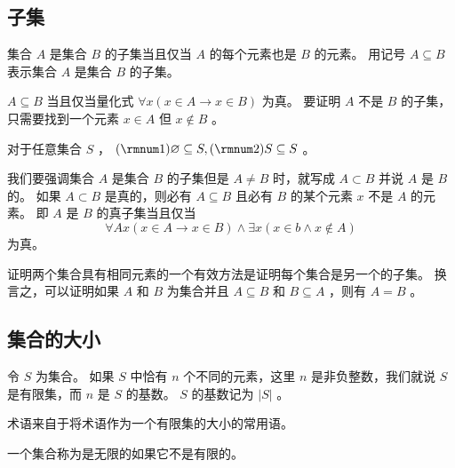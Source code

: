 {    \subsection{子集}
    {
        \begin{defines}
            集合 $A$ 是集合 $B$ 的子集当且仅当 $A$ 的每个元素也是 $B$ 的元素。
            用记号 $A \subseteq B$ 表示集合 $A$ 是集合 $B$ 的子集。

            $A \subseteq B$ 当且仅当量化式 $\forall x (x \in A \rightarrow x \in B)$ 为真。
            要证明 $A$ 不是 $B$ 的子集，只需要找到一个元素 $x \in A$ 但 $x \notin B$ 。
        \end{defines}

        \begin{defines}
            对于任意集合 $S$ ， $(\rmnum 1) \varnothing \subseteq S, (\rmnum 2) S \subseteq S$ 。
        \end{defines}

        我们要强调集合 $A$ 是集合 $B$ 的子集但是 $A \neq B$ 时，就写成 $A \subset B$ 并说 $A$ 是 $B$ 的。
        如果 $A \subset B$ 是真的，则必有 $A \subseteq B$ 且必有 $B$ 的某个元素 $x$ 不是 $A$ 的元素。
        即 $A$ 是 $B$ 的真子集当且仅当
        $$\forall A x (x \in A \rightarrow x \in B) \wedge \exists x (x \in b \wedge x \notin A)$$
        为真。

        {
            证明两个集合具有相同元素的一个有效方法是证明每个集合是另一个的子集。
            换言之，可以证明如果 $A$ 和 $B$ 为集合并且 $A \subseteq B$ 和 $B \subseteq A$ ，则有 $A = B$ 。
        }
    }

    \subsection{集合的大小}
    {
        \begin{defines}
            令 $S$ 为集合。
            如果 $S$ 中恰有 $n$ 个不同的元素，这里 $n$ 是非负整数，我们就说 $S$ 是有限集，而 $n$ 是 $S$ 的基数。
            $S$ 的基数记为 $|S|$ 。
        \end{defines}

        \begin{defines}
            术语来自于将术语作为一个有限集的大小的常用语。
        \end{defines}

        \begin{defines}
            一个集合称为是无限的如果它不是有限的。
        \end{defines}
    }
}
